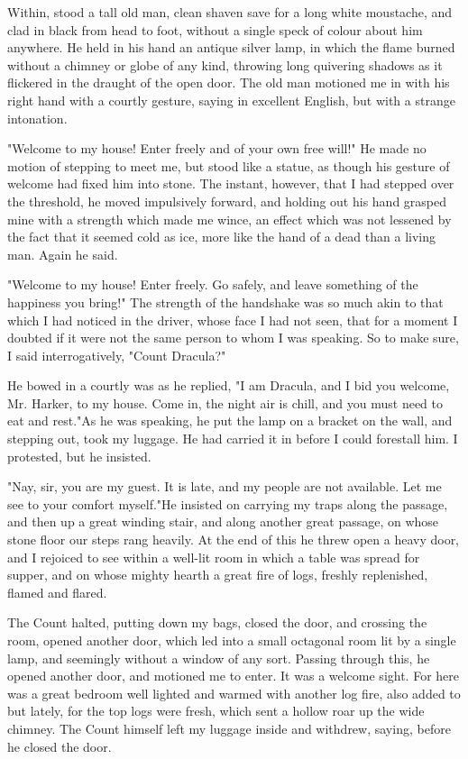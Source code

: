 Within, stood a tall old man, clean shaven save for a long white moustache, and clad in black from head to foot, without a single speck of colour about him anywhere. He held in his hand an antique silver lamp, in which the flame burned without a chimney or globe of any kind, throwing long quivering shadows as it flickered in the draught of the open door. The old man motioned me in with his right hand with a courtly gesture, saying in excellent English, but with a strange intonation. 

"Welcome to my house! Enter freely and of your own free will!" He made no motion of stepping to meet me, but stood like a statue, as though his gesture of welcome had fixed him into stone. The instant, however, that I had stepped over the threshold, he moved impulsively forward, and holding out his hand grasped mine with a strength which made me wince, an effect which was not lessened by the fact that it seemed cold as ice, more like the hand of a dead than a living man. Again he said. 

"Welcome to my house! Enter freely. Go safely, and leave something of the happiness you bring!" The strength of the handshake was so much akin to that which I had noticed in the driver, whose face I had not seen, that for a moment I doubted if it were not the same person to whom I was speaking. So to make sure, I said interrogatively, "Count Dracula?" 

He bowed in a courtly was as he replied, "I am Dracula, and I bid you welcome, Mr. Harker, to my house. Come in, the night air is chill, and you must need to eat and rest."As he was speaking, he put the lamp on a bracket on the wall, and stepping out, took my luggage. He had carried it in before I could forestall him. I protested, but he insisted. 

"Nay, sir, you are my guest. It is late, and my people are not available. Let me see to your comfort myself."He insisted on carrying my traps along the passage, and then up a great winding stair, and along another great passage, on whose stone floor our steps rang heavily. At the end of this he threw open a heavy door, and I rejoiced to see within a well-lit room in which a table was spread for supper, and on whose mighty hearth a great fire of logs, freshly replenished, flamed and flared. 

The Count halted, putting down my bags, closed the door, and crossing the room, opened another door, which led into a small octagonal room lit by a single lamp, and seemingly without a window of any sort. Passing through this, he opened another door, and motioned me to enter. It was a welcome sight. For here was a great bedroom well lighted and warmed with another log fire, also added to but lately, for the top logs were fresh, which sent a hollow roar up the wide chimney. The Count himself left my luggage inside and withdrew, saying, before he closed the door. 

